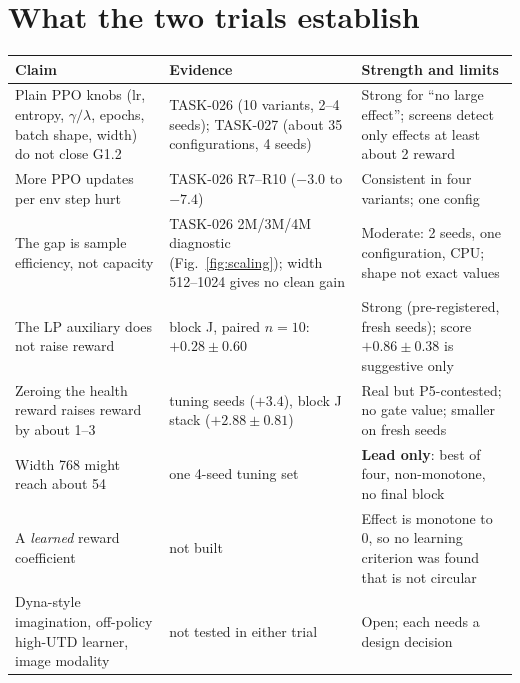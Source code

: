 \documentclass[10pt,a4paper]{article}
\begin{document}
\section{What the two trials establish}\label{sec:claims}
\small
\begin{longtable}{@{}p{5.9cm}p{4.1cm}p{5.6cm}@{}}\toprule
\textbf{Claim} & \textbf{Evidence} & \textbf{Strength and limits}\\\midrule\endhead
Plain PPO knobs (lr, entropy, $\gamma/\lambda$, epochs, batch shape, width) do not close G1.2 & TASK-026 (10 variants, 2--4 seeds); TASK-027 (about 35 configurations, 4 seeds) & Strong for ``no large effect''; screens detect only effects at least about 2 reward\\
More PPO updates per env step hurt & TASK-026 R7--R10 ($-3.0$ to $-7.4$) & Consistent in four variants; one config\\
The gap is sample efficiency, not capacity & TASK-026 2M/3M/4M diagnostic (Fig.~\ref{fig:scaling}); width 512--1024 gives no clean gain & Moderate: 2 seeds, one configuration, CPU; shape not exact values\\
The LP auxiliary does not raise reward & block J, paired $n=10$: $+0.28\pm0.60$ & Strong (pre-registered, fresh seeds); score $+0.86\pm0.38$ is suggestive only\\
Zeroing the health reward raises reward by about 1--3 & tuning seeds ($+3.4$), block J stack ($+2.88\pm0.81$) & Real but P5-contested; no gate value; smaller on fresh seeds\\
Width 768 might reach about 54 & one 4-seed tuning set & \textbf{Lead only}: best of four, non-monotone, no final block\\
A \emph{learned} reward coefficient & not built & Effect is monotone to 0, so no learning criterion was found that is not circular\\
Dyna-style imagination, off-policy high-UTD learner, image modality & not tested in either trial & Open; each needs a design decision\\\bottomrule
\end{longtable}
\normalsize

\end{document}
